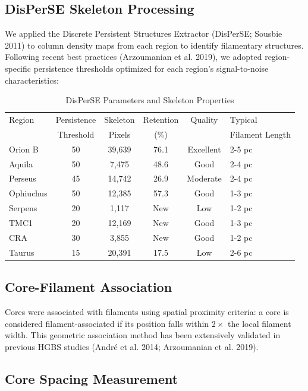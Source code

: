 \documentclass[11pt,a4paper]{article}
\begin{document}
\subsection{DisPerSE Skeleton Processing}

We applied the Discrete Persistent Structures Extractor (DisPerSE; Sousbie 2011) to column density maps from each region to identify filamentary structures. Following recent best practices (Arzoumanian et al. 2019), we adopted region-specific persistence thresholds optimized for each region's signal-to-noise characteristics:

\begin{table}[H]
\centering
\caption{DisPerSE Parameters and Skeleton Properties}
\begin{tabular}{lcccc}
\toprule
Region & Persistence & Skeleton & Retention & Quality & Typical \\
       & Threshold & Pixels  & (\%)   &          & Filament Length \\
\midrule
Orion B  & 50  & 39,639  & 76.1   & Excellent  & 2-5 pc \\
Aquila   & 50  & 7,475   & 48.6   & Good      & 2-4 pc \\
Perseus  & 45  & 14,742  & 26.9   & Moderate   & 2-4 pc \\
Ophiuchus& 50  & 12,385  & 57.3   & Good      & 1-3 pc \\
Serpens  & 20  & 1,117   & New     & Low       & 1-2 pc \\
TMC1     & 20  & 12,169  & New     & Good      & 1-3 pc \\
CRA      & 30  & 3,855   & New     & Good      & 1-2 pc \\
Taurus   & 15  & 20,391  & 17.5   & Low       & 2-6 pc \\
\bottomrule
\end{tabular}
\end{table}

\subsection{Core-Filament Association}

Cores were associated with filaments using spatial proximity criteria: a core is considered filament-associated if its position falls within $2\times$ the local filament width. This geometric association method has been extensively validated in previous HGBS studies (Andr\'e et al. 2014; Arzoumanian et al. 2019).

\subsection{Core Spacing Measurement}
\end{document}
